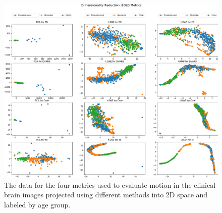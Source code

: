 \begin{figure}[t!]
\centering
\includegraphics[width=1.0\textwidth]{6/figures/bold-2d-all-agegroup.png}
\caption{The data for the four metrics used to evaluate motion in the clinical brain images projected using different methods into 2D space and labeled by age group.}
\label{fig:mocha-ages-data-2d}
\end{figure}

